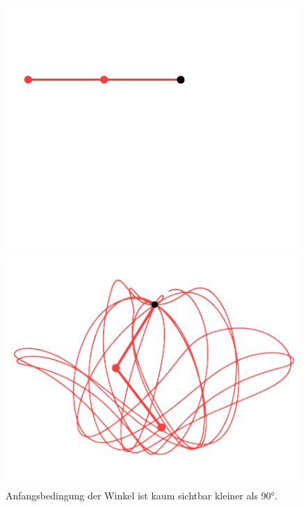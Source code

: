 \begin{figure}
    \label{fig:pendel_bei_90}
    \centering
    \begin{minipage}{0.45\textwidth}
        \centering
        \includegraphics[width=\textwidth]{papers/doppelpendel/images/pendel_stand_kleiner_90.png}
    \end{minipage}
    \hfill
    \begin{minipage}{0.45\textwidth}
        \centering
        \includegraphics[width=\textwidth]{papers/doppelpendel/images/pendel_spur_kleiner_90.png}
    \end{minipage}
    \caption{Anfangsbedingung der Winkel ist kaum sichtbar kleiner als 90°.}

\end{figure}
